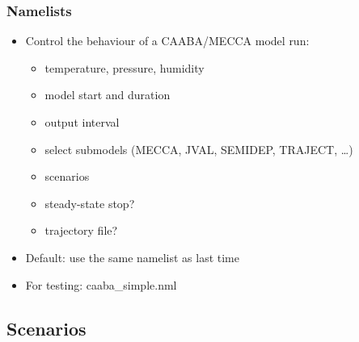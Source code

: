 \documentclass[t]{beamer}
\begin{document}
\begin{frame}

  \frametitle{Namelists}

  \begin{itemize}
  \item Control the behaviour of a CAABA/MECCA model run:
    \begin{itemize}
    \item temperature, pressure, humidity
    \item model start and duration
    \item output interval
    \item select submodels (MECCA, JVAL, SEMIDEP, TRAJECT, \dots)
    \item scenarios
    \item steady-state stop?
    \item trajectory file?
    \end{itemize}
  \item Default: use the same namelist as last time
  \item For testing: caaba\_simple.nml
  \end{itemize}

\end{frame}


\subsection{Scenarios}
\end{document}

